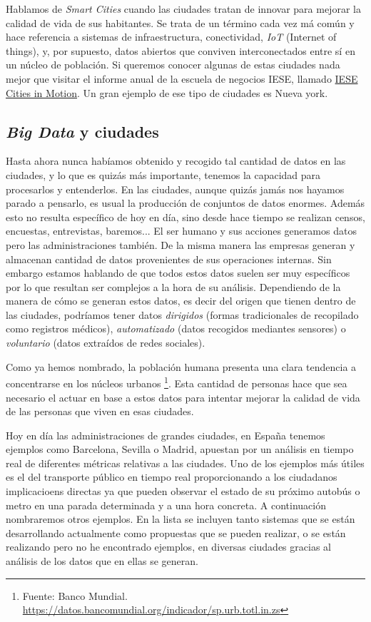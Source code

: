 Hablamos de \textit{Smart Cities} cuando las ciudades tratan de innovar para mejorar la calidad de vida de sus habitantes. Se trata de un término cada vez má común y hace referencia a sistemas de infraestructura, conectividad, \emph{IoT} (Internet of things), y, por supuesto, datos abiertos que conviven interconectados entre sí en un núcleo de población.  Si queremos conocer algunas de estas ciudades nada mejor que visitar el informe anual de la escuela de negocios IESE, llamado \href{https://citiesinmotion.iese.edu/indicecim/}{IESE Cities in Motion}. Un gran ejemplo de ese tipo de ciudades es Nueva york.

\subsection{\emph{Big Data} y ciudades}
Hasta ahora nunca habíamos obtenido y recogido tal cantidad de datos en las ciudades, y lo que es quizás más importante, tenemos la capacidad para procesarlos y entenderlos. En las ciudades, aunque quizás jamás nos hayamos parado a pensarlo, es usual la producción de conjuntos de datos enormes. Además esto no resulta específico de hoy en día, sino desde hace tiempo se realizan censos, encuestas, entrevistas, baremos... El ser humano y sus acciones generamos datos pero las administraciones también. De la misma manera las empresas generan y almacenan cantidad de datos provenientes de sus operaciones internas. Sin embargo estamos hablando de que todos estos datos suelen ser muy específicos por lo que resultan ser complejos a la hora de su análisis. Dependiendo de la manera de cómo se generan estos datos, es decir del origen que tienen dentro de las ciudades, podríamos tener datos \textit{dirigidos} (formas tradicionales de recopilado como registros médicos), \textit{automatizado} (datos recogidos mediantes sensores) o \textit{voluntario} (datos extraídos de redes sociales).

 Como ya hemos nombrado, la población humana presenta una clara tendencia a concentrarse en los núcleos urbanos \footnote{Fuente: Banco Mundial. \url{https://datos.bancomundial.org/indicador/sp.urb.totl.in.zs}}. Esta cantidad de personas hace que sea necesario el actuar en base a estos datos para intentar mejorar la calidad de vida de las personas que viven en esas ciudades. 
 
 Hoy en día las administraciones de grandes ciudades, en España tenemos ejemplos como Barcelona, Sevilla o Madrid, apuestan por un análisis en tiempo real de diferentes métricas relativas a las ciudades. Uno de los ejemplos más útiles es el del transporte público en tiempo real proporcionando a los ciudadanos implicacioens directas ya que pueden observar el estado de su próximo autobús o metro en una parada determinada y a una hora concreta. A continuación nombraremos otros ejemplos.  En la lista se incluyen tanto sistemas que se están desarrollando actualmente como propuestas que se pueden realizar, o se están realizando pero no he encontrado ejemplos, en diversas ciudades gracias al análisis de los datos que en ellas se generan.
 
